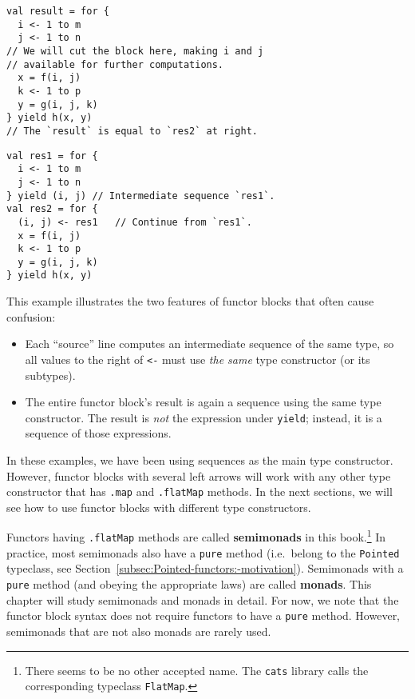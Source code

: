 \noindent \texttt{\textcolor{blue}{\footnotesize{}}}%
\begin{minipage}[c]{0.475\columnwidth}%
\texttt{\textcolor{blue}{\footnotesize{}}}
\begin{lstlisting}
val result = for {
  i <- 1 to m
  j <- 1 to n
// We will cut the block here, making i and j
// available for further computations.
  x = f(i, j)
  k <- 1 to p
  y = g(i, j, k)
} yield h(x, y)
// The `result` is equal to `res2` at right.
\end{lstlisting}
%
\end{minipage}\texttt{\textcolor{blue}{\footnotesize{}\hspace*{\fill}}}%
\begin{minipage}[c]{0.475\columnwidth}%
\texttt{\textcolor{blue}{\footnotesize{}}}
\begin{lstlisting}
val res1 = for {
  i <- 1 to m
  j <- 1 to n
} yield (i, j) // Intermediate sequence `res1`.
val res2 = for {
  (i, j) <- res1   // Continue from `res1`.
  x = f(i, j)
  k <- 1 to p
  y = g(i, j, k)
} yield h(x, y)
\end{lstlisting}
%
\end{minipage}{\footnotesize\par}

\vspace{0.2\baselineskip}
This example illustrates the two features of functor blocks that often
cause confusion:
\begin{itemize}
\item Each \textsf{``}source\textsf{''} line computes an intermediate sequence of the same
type, so all values to the right of \lstinline!<-! must use \emph{the
same} type constructor (or its subtypes).
\item The entire functor block\textsf{'}s result is again a sequence using the same
type constructor. The result is \emph{not} the expression under \lstinline!yield!;
instead, it is a sequence of those expressions.
\end{itemize}
In these examples, we have been using sequences as the main type constructor.
However, functor blocks with several left arrows will work with any
other type constructor that has \lstinline!.map! and \lstinline!.flatMap!
methods. In the next sections, we will see how to use functor blocks
with different type constructors. 

Functors having \lstinline!.flatMap! methods are called \textbf{semimonads}
in this book.\footnote{There seems to be no other accepted name. The \texttt{cats} library
calls the corresponding typeclass \lstinline!FlatMap!.} In practice, most semimonads also have a \lstinline!pure! method
(i.e.~belong to the \lstinline!Pointed! typeclass, see Section~\ref{subsec:Pointed-functors:-motivation}).
Semimonads with a \lstinline!pure! method (and obeying the appropriate
laws) are called \textbf{monads}. This chapter will
study semimonads and monads in detail. For now, we note that the functor
block syntax does not require functors to have a \lstinline!pure!
method. However, semimonads that are not also monads are rarely used.

